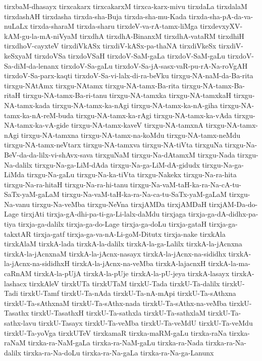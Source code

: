{tirxbaM-dhasayx
tirxcakarx
tirxcakarxM
tirxca-karx-mivu
tirxdaLa
tirxdalaM
tirxdashAH
tirxdasha
tirxda-sha-Buja
tirxda-sha-mu-Kada
tirxda-sha-pA-da-va-nuLaLx
tirxda-sharaM
tirxda-sharu
tirxdeV-va-rA-tamx-liMga
tirxdevxyXV-kAM-gu-la-mA-niVyaM
tirxdhA
tirxdhA-BinanxM
tirxdhA-vataRM
tirxdhiH
tirxdhoV-cayxteV
tirxdiVkASx
tirxdiV-kASx-pa-thaNA
tirxdiVkeSx
tirxdiV-keSxyaM
tirxdoVSa
tirxdoVSaH
tirxdoV-SaM-gaLa
tirxdoV-SaM-gaLu
tirxdoV-Sa-diM-da-lenanx
tirxdoV-Sa-gaLu
tirxdoV-Sa-jA-sasx-vaR-pu-rA-Na-roVgAH
tirxdoV-Sa-parx-kaqti
tirxdoV-Sa-vi-lalx-di-ra-beVku
tirxgu-NA-naM-da-Ba-rita
tirxgu-NAtAmx
tirxgu-NAtamx
tirxgu-NA-tamx-Ba-rita
tirxgu-NA-tamx-Ba-ritaH
tirxgu-NA-tamx-Ba-ri-tanu
tirxgu-NA-tamxka
tirxgu-NA-tamxkaH
tirxgu-NA-tamx-kada
tirxgu-NA-tamx-ka-nAgi
tirxgu-NA-tamx-ka-nA-giha
tirxgu-NA-tamx-ka-nA-reM-buda
tirxgu-NA-tamx-ka-rAgi
tirxgu-NA-tamx-ka-vAda
tirxgu-NA-tamx-ka-vA-gide
tirxgu-NA-tamx-kaveV
tirxgu-NA-tamxnA
tirxgu-NA-tamx-nAgi
tirxgu-NA-tamxna
tirxgu-NA-tamx-na-koMdu
tirxgu-NA-tamx-neMdu
tirxgu-NA-tamx-neVtarx
tirxgu-NA-tamxva
tirxgu-NA-tiVta
tirxguNa
tirxgu-Na-BeV-da-da-lilx-vi-shAvx-sava
tirxguNaM
tirxgu-Na-dAtamxM
tirxgu-Nada
tirxgu-Na-dalilx
tirxgu-Na-ga-LiM-dAda
tirxgu-Na-ga-LiM-dA-gidudx
tirxgu-Na-ga-LiMda
tirxgu-Na-gaLu
tirxgu-Na-ka-tiVta
tirxgu-Nakekx
tirxgu-Na-ra-hita
tirxgu-Na-ra-hitaH
tirxgu-Na-ra-hi-tanu
tirxgu-Na-vaM-taH-ka-ra-Na-cA-tu-SaTx-yaM-gaLaM
tirxgu-Na-vaM-taH-ka-ra-Na-ca-tu-SaTx-yaM-gaLaM
tirxgu-Na-vanu
tirxgu-Na-veMba
tirxgu-NeVna
tirxjAMDa
tirxjAMDaH
tirxjAM-Da-do-Lage
tirxjAti
tirxja-gA-dhi-pa-ti-ga-Li-lalx-daMdu
tirxjaga
tirxja-ga-dA-didhx-pa-tiya
tirxja-ga-dalilx
tirxja-ga-do-Lage
tirxja-ga-doLu
tirxja-gataH
tirxja-ga-takxtAR
tirxja-gatf
tirxja-ga-va-nA-Li-goM-Ditutx
tirxja-nake
tirxkAla
tirxkAlaM
tirxkA-lada
tirxkA-la-dalilx
tirxkA-la-ga-Lalilx
tirxkA-la-jAcnxna
tirxkA-la-jAcnxnaM
tirxkA-la-jAcnx-nasayx
tirxkA-la-jAcnx-na-sididhx
tirxkA-la-jAcnx-na-sididhxH
tirxkA-la-jAcnx-na-veMba
tirxkA-lajacnxH
tirxkA-la-ma-caRnAM
tirxkA-la-pUjA
tirxkA-la-pUje
tirxkA-la-pU-jeya
tirxkA-lasayx
tirxkA-lashacx
tirxkAleV
tirxkUTa
tirxkUTaM
tirxkU-Tada
tirxkU-Ta-dalilx
tirxkU-Tadi
tirxkU-Tamf
tirxkU-Ta-nAda
tirxkU-Ta-nA-mApi
tirxkU-Ta-sAthxna
tirxkU-Ta-sAthxnaM
tirxkU-Ta-sAthx-nada
tirxkU-Ta-sAthx-na-veMba
tirxkU-Tasathx
tirxkU-TasathxH
tirxkU-Ta-sathxla
tirxkU-Ta-sathxlaM
tirxkU-Ta-sathx-lavu
tirxkU-Tasayx
tirxkU-Ta-veMba
tirxkU-Ta-veMdU
tirxkU-Ta-veMdu
tirxkU-Ta-yoVga
tirxkUTeV
tirxkamaR
tirxka-maRM-gaLu
tirxka-raNa
tirxka-raNaM
tirxka-ra-NaM-gaLa
tirxka-ra-NaM-gaLu
tirxka-ra-Nada
tirxka-ra-Na-dalilx
tirxka-ra-Na-doLu
tirxka-ra-Na-gaLa
tirxka-ra-Na-ga-Lanunx
}
